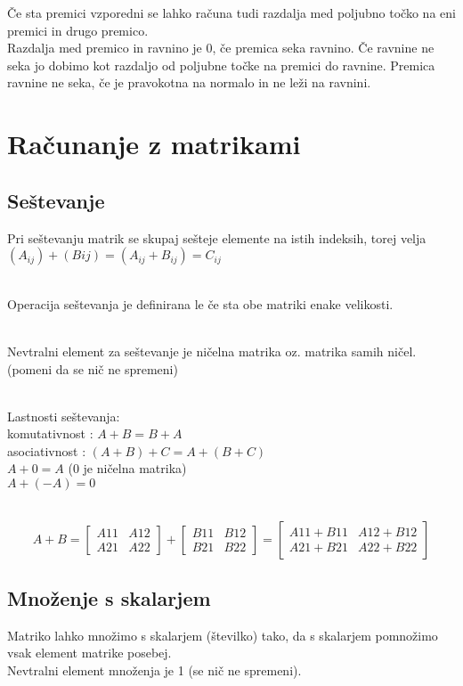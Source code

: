 \documentclass[12pt]{report}
\begin{document}
Če sta premici vzporedni se lahko računa tudi razdalja med poljubno točko na eni premici in drugo premico.\\

Razdalja med premico in ravnino je 0, če premica seka ravnino. Če ravnine ne seka jo dobimo kot razdaljo od poljubne točke na premici do ravnine. Premica ravnine ne seka, če je pravokotna na normalo in ne leži na ravnini.


\pagebreak
\section*{Računanje z matrikami}

\subsection*{Seštevanje} 
Pri seštevanju matrik se skupaj sešteje elemente na istih indeksih, torej velja
$(A_{ij})+(Bij) =(A_{ij}+B_{ij}) = C_{ij}$\\\

Operacija seštevanja je definirana le če sta obe matriki enake velikosti.\\\

Nevtralni element za seštevanje je ničelna matrika oz. matrika samih ničel. (pomeni da se nič ne spremeni)\\\ 

Lastnosti seštevanja:\\
komutativnost : $A+B = B+A$\\
asociativnost  : $(A+B)+C = A+(B+C)$ \\
$A+0 = A $ (0 je ničelna matrika)\\
$A + (-A) = 0 $\\\

\[
A + B = \begin{bmatrix} A11&  A12\\ A21&  A22\end{bmatrix} + \begin{bmatrix}B11 &B12 \\ B21&B22 \end{bmatrix} = \begin{bmatrix}A11+B11 &A12+B12 \\ A21+B21 &A22+B22 \end{bmatrix}\]

\subsection*{Množenje s skalarjem}
Matriko lahko množimo s skalarjem (številko) tako, da s skalarjem pomnožimo vsak element matrike posebej.\\
Nevtralni element množenja je 1 (se nič ne spremeni).\\\
\end{document}
